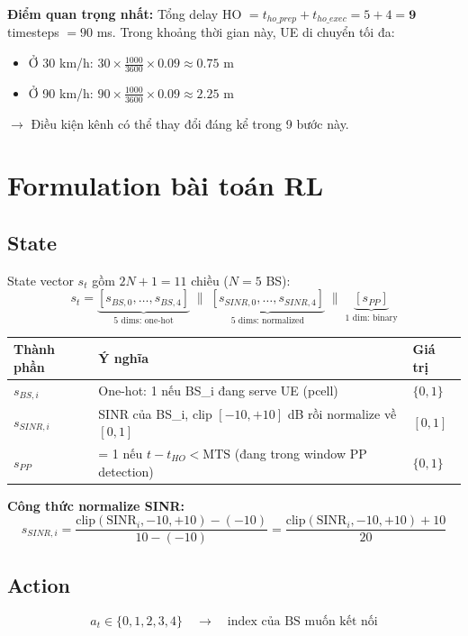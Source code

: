 \documentclass[11pt]{article}
\begin{document}
\textbf{Điểm quan trọng nhất:} Tổng delay HO $= t_{ho\_prep} + t_{ho\_exec} = 5 + 4 = \mathbf{9}$ timesteps $= 90$ ms. Trong khoảng thời gian này, UE di chuyển tối đa:
\begin{itemize}
  \item Ở 30 km/h: $30 \times \frac{1000}{3600} \times 0.09 \approx 0.75\text{ m}$
  \item Ở 90 km/h: $90 \times \frac{1000}{3600} \times 0.09 \approx 2.25\text{ m}$
\end{itemize}

$\rightarrow$ Điều kiện kênh có thể thay đổi đáng kể trong 9 bước này.

\section{Formulation bài toán RL}

\subsection{State}

State vector $s_t$ gồm $2N+1 = 11$ chiều ($N=5$ BS):
\[
s_t = \underbrace{[s_{BS,0}, \ldots, s_{BS,4}]}_{\text{5 dims: one-hot}} \;\|\; \underbrace{[s_{SINR,0}, \ldots, s_{SINR,4}]}_{\text{5 dims: normalized}} \;\|\; \underbrace{[s_{PP}]}_{\text{1 dim: binary}}
\]

\begin{longtable}{@{}lp{7cm}l@{}}
\toprule
\textbf{Thành phần} & \textbf{Ý nghĩa} & \textbf{Giá trị} \\
\midrule
\endhead
$s_{BS,i}$ & One-hot: 1 nếu BS\_i đang serve UE (pcell) & $\{0, 1\}$ \\
$s_{SINR,i}$ & SINR của BS\_i, clip $[-10,+10]$ dB rồi normalize về $[0,1]$ & $[0, 1]$ \\
$s_{PP}$ & = 1 nếu $t - t_{HO} < \text{MTS}$ (đang trong window PP detection) & $\{0, 1\}$ \\
\bottomrule
\end{longtable}

\textbf{Công thức normalize SINR:}
\[
s_{SINR,i} = \frac{\text{clip}(\text{SINR}_i, -10, +10) - (-10)}{10 - (-10)} = \frac{\text{clip}(\text{SINR}_i, -10, +10) + 10}{20}
\]

\subsection{Action}

\[
a_t \in \{0, 1, 2, 3, 4\} \quad \longrightarrow \quad \text{index của BS muốn kết nối}
\]
\end{document}
